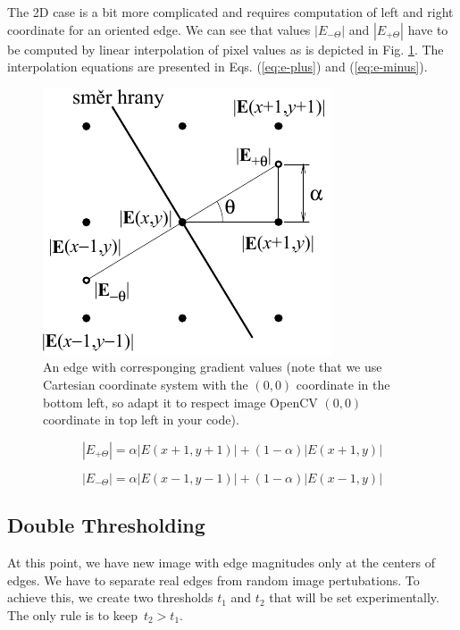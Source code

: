\documentclass[12pt]{article}
\begin{document}
\noindent
The 2D case is a bit more complicated and requires computation of left and right coordinate for an oriented edge.
We can see that values $|E_{-\Theta}|$ and $|E_{+\Theta}|$ have to be computed by linear interpolation of pixel values as is depicted in Fig. \ref{fig:pixel-scheme}.
The interpolation equations are presented in Eqs. (\ref{eq:e-plus}) and (\ref{eq:e-minus}).

\begin{figure}[h]
\begin{centering}
    \includegraphics{pixel_scheme}
    \caption{An edge with corresponging gradient values (note that we use Cartesian coordinate system with the $(0, 0)$ coordinate in the bottom left, so adapt it to respect image OpenCV $(0, 0)$ coordinate in top left in your code).}
    \label{fig:pixel-scheme}
\end{centering}
\end{figure}

\newpage

\begin{equation}
    |E_{+\Theta}| = \alpha |E(x + 1, y + 1)| + (1 - \alpha) |E(x + 1, y)|
    \label{eq:e-plus}
\end{equation}

\begin{equation}
    |E_{-\Theta}| = \alpha |E(x - 1, y - 1)| + (1 - \alpha) |E(x - 1, y)|
    \label{eq:e-minus}
\end{equation}

\subsection*{Double Thresholding}

At this point, we have new image with edge magnitudes only at the centers of edges.
We have to separate real edges from random image pertubations.
To achieve this, we create two thresholds $t_1$ and $t_2$ that will be set experimentally.
The only rule is to keep~$t_2 > t_1$.
\end{document}
